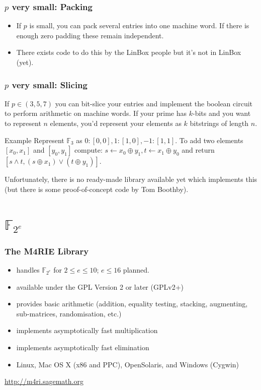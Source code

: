 \documentclass[11pt]{beamer}
\newcommand{\field}[1]{\mathbb{#1}}
\newcommand{\F}{\ensuremath{\field{F}}\xspace}
\begin{document}
\begin{frame}
\frametitle{$p$ very small: Packing} 

\begin{itemize}
 \item If $p$ is small, you can pack several entries into one machine word. If there is enough zero padding these remain independent.
 \item There exists code to do this by the LinBox people but it's not in LinBox (yet).
\end{itemize}
\end{frame}

\begin{frame}
\frametitle{$p$ very small: Slicing} 
If $p \in (3,5,7)$ you can bit-slice your entries and implement the boolean circuit to perform arithmetic on machine words. If your prime has $k$-bits and you want to represent $n$ elements, you'd represent your elements as $k$ bitstrings of length $n$.

\vspace{1em}

\begin{block}{Example}
Represent $\F_3$ as $0: [0,0], 1: [1,0], -1: [1,1]$. To add two elements $[x_0,x_1]$ and $[y_0,y_1]$ compute:
$s \leftarrow x_0 \oplus y_1, t \leftarrow x_1 \oplus y_0$ and return $[s \wedge t, (s \oplus x_1) \vee (t \oplus y_1)]$.
 \end{block}

\vspace{1em}

Unfortunately, there is no ready-made library available yet which implements this (but there is some proof-of-concept code by Tom Boothby).

\end{frame}


\section{\texorpdfstring{$\F_{2^e}$}{F2E}}

\begin{frame}
\frametitle{The M4RIE Library}
\begin{itemize}
\item handles $\mathbb{F}_{2^e}$ for $2 \leq e \leq 10$; $e \leq 16$ planned.
\item available under the GPL Version 2 or later (GPLv2+)
\item provides basic arithmetic (addition, equality testing, stacking, augmenting, sub-matrices, randomisation, etc.)
\item implements asymptotically fast multiplication
\item implements asymptotically fast elimination
\item Linux, Mac OS X (x86 and PPC), OpenSolaris, and Windows (Cygwin)
\end{itemize}

\begin{block}{}
\centering
\url{http://m4ri.sagemath.org} 
\end{block}
\end{frame}
\end{document}
